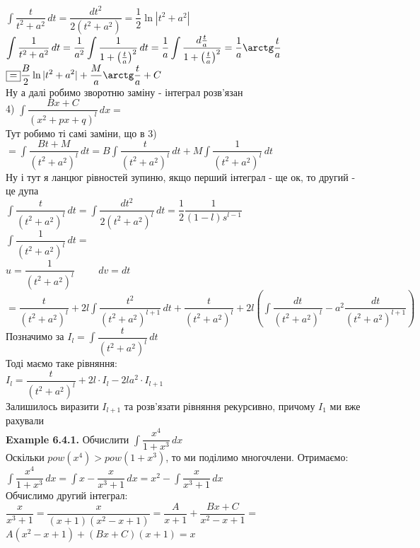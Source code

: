 \documentclass[a4paper, 14pt]{extarticle}
\def\huge{\displaystyle}
\def\bigline{\vspace{5mm}\\}
\def\ex#1{\textbf{Example {#1}}}
\def\bigline{\vspace{5mm}\\}
\begin{document}
$\huge \int \dfrac{t}{t^2+a^2}\,dt = \dfrac{dt^2}{2(t^2+a^2)} = \dfrac{1}{2} \ln|t^2+a^2|$\\
$\huge \int \dfrac{1}{t^2+a^2}\,dt = \dfrac{1}{a^2} \int \dfrac{1}{1 + \left(\frac{t}{a}\right)^2}\,dt = \dfrac{1}{a} \int \dfrac{d \frac{t}{a}}{1 + \left(\frac{t}{a}\right)^2} = \dfrac{1}{a} \arctg \dfrac{t}{a}$\\
$\boxed{=} \huge \frac{B}{2} \ln|t^2+a^2| + \frac{M}{a} \arctg \frac{t}{a} + C$\\
Ну а далі робимо зворотню заміну - інтеграл розв'язан
\bigline
4) $\huge \int \dfrac{Bx+C}{(x^2+px+q)^l}\,dx =$\\
Тут робимо ті самі заміни, що в 3)\\
$= \huge \int \dfrac{Bt+M}{(t^2+a^2)^l}\,dt = B \int \dfrac{t}{(t^2+a^2)^l} \,dt + M \int \dfrac{1}{(t^2+a^2)^l}\,dt$\\
Ну і тут я ланцюг рівностей зупиню, якщо перший інтеграл - ще ок, то другий - це дупа\\
$\huge \int \dfrac{t}{(t^2+a^2)^l}\,dt = \int \dfrac{dt^2}{2(t^2+a^2)^l}\,dt = \dfrac{1}{2} \dfrac{1}{(1-l)s^{l-1}}$\bigline
$\huge \int \dfrac{1}{(t^2+a^2)^l}\,dt =$\\
$u = \dfrac{1}{(t^2+a^2)^l} \hspace{1cm} dv = dt$\\
$= \huge \dfrac{t}{(t^2+a^2)^l} + 2l \int \dfrac{t^2}{(t^2+a^2)^{l+1}}\,dt + \dfrac{t}{(t^2+a^2)^l} + 2l \left(\int \dfrac{dt}{(t^2+a^2)^l} - a^2 \dfrac{dt}{(t^2+a^2)^{l+1}} \right)$\\
Позначимо за $I_l = \huge \int \dfrac{t}{(t^2+a^2)^l}\,dt$\\
Тоді маємо таке рівняння:\\
$I_l = \dfrac{t}{(t^2+a^2)^l} + 2l \cdot I_l - 2la^2 \cdot I_{l+1}$\\
Залишилось виразити $I_{l+1}$ та розв'язати рівняння рекурсивно, причому $I_1$ ми вже рахували
\bigline
\ex{6.4.1.} Обчислити $\huge \int \dfrac{x^4}{1+x^3}\,dx$\\
Оскільки $pow(x^4) > pow(1+x^3)$, то ми поділимо многочлени. Отримаємо:\\
$\huge \int \dfrac{x^4}{1+x^3}\,dx = \int x - \dfrac{x}{x^3+1}\,dx = x^2 - \int \dfrac{x}{x^3+1}\,dx$\\
Обчислимо другий інтеграл:\\
$\dfrac{x}{x^3+1} = \dfrac{x}{(x+1)(x^2-x+1)} = \dfrac{A}{x+1} + \dfrac{Bx+C}{x^2-x+1} \boxed{=}$\\
$A(x^2-x+1) + (Bx+C)(x+1) = x$\\
\end{document}
